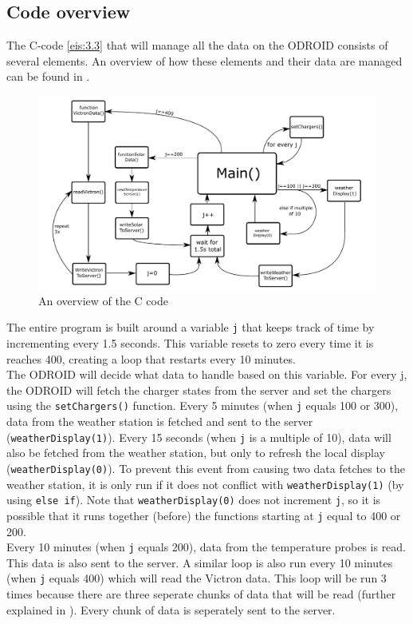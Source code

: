 \subsection{Code overview}\label{sec:code_overview}
The C-code \ref{eis:3.3} that will manage all the data on the ODROID consists of several elements. An overview of how these elements and their data are managed can be found in .\\

\begin{figure}[!ht]
  \centering
    \includegraphics[width=1.0\textwidth]{images/ODROID_code_overview.pdf}
      \caption{An overview of the C code}\label{fig:code_overview}
\end{figure}

The entire program is built around a variable \verb|j| that keeps track of time by incrementing every 1.5 seconds. This variable resets to zero every time it is reaches 400, creating a loop that restarts every 10 minutes.\\

The ODROID will decide what data to handle based on this variable. For every j, the ODROID will fetch the charger states from the server and set the chargers using the \verb|setChargers()| function. Every 5 minutes (when \verb|j| equals 100 or 300), data from the weather station is fetched and sent to the server (\verb|weatherDisplay(1)|). Every 15 seconds (when \verb|j| is a multiple of 10), data will also be fetched from the weather station, but only to refresh the local display (\verb|weatherDisplay(0)|). To prevent this event from causing two data fetches to the weather station, it is only run if it does not conflict with \verb|weatherDisplay(1)| (by using \verb|else if|). Note that \verb|weatherDisplay(0)| does not increment \verb|j|, so it is possible that it runs together (before) the functions starting at \verb|j| equal to 400 or 200.\\

Every 10 minutes (when \verb|j| equals 200), data from the temperature probes is read. This data is also sent to the server. A similar loop is also run every 10 minutes (when \verb|j| equals 400) which will read the Victron data. This loop will be run 3 times because there are three seperate chunks of data that will be read (further explained in ). Every chunk of data is seperately sent to the server.\\